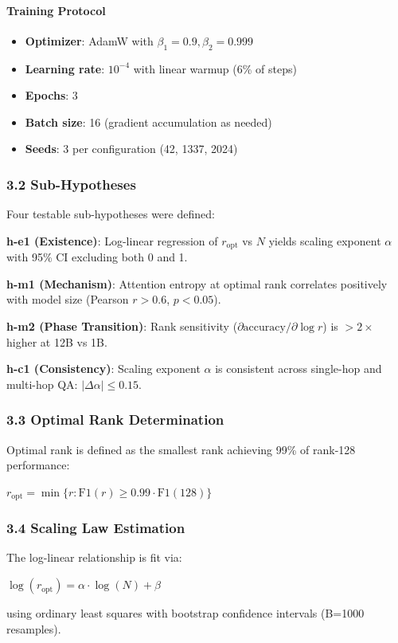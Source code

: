 \paragraph{Training Protocol}

\begin{itemize}
\item \textbf{Optimizer}: AdamW with $\beta _{1}=0.9, \beta _{2}=0.999$
\item \textbf{Learning rate}: $10^{-4}$ with linear warmup (6\% of steps)
\item \textbf{Epochs}: 3
\item \textbf{Batch size}: 16 (gradient accumulation as needed)
\item \textbf{Seeds}: 3 per configuration (42, 1337, 2024)
\end{itemize}

\subsubsection{3.2 Sub-Hypotheses}

Four testable sub-hypotheses were defined:

\textbf{h-e1 (Existence)}: Log-linear regression of $r_{\text{opt}}$ vs $N$ yields scaling exponent $\alpha$ with 95\% CI excluding both 0 and 1.

\textbf{h-m1 (Mechanism)}: Attention entropy at optimal rank correlates positively with model size (Pearson $r > 0.6$, $p < 0.05$).

\textbf{h-m2 (Phase Transition)}: Rank sensitivity ($\partial \text{accuracy}/\partial \log r$) is $>2\times$ higher at 12B vs 1B.

\textbf{h-c1 (Consistency)}: Scaling exponent $\alpha$ is consistent across single-hop and multi-hop QA: $|\Delta \alpha| \leq 0.15$.

\subsubsection{3.3 Optimal Rank Determination}

Optimal rank is defined as the smallest rank achieving 99\% of rank-128 performance:

$r_{\text{opt}} = \min\{r : \text{F1}(r) \geq 0.99 \cdot \text{F1}(128)\}$

\subsubsection{3.4 Scaling Law Estimation}

The log-linear relationship is fit via:

$\log(r_{\text{opt}}) = \alpha \cdot \log(N) + \beta$

using ordinary least squares with bootstrap confidence intervals (B=1000 resamples).

